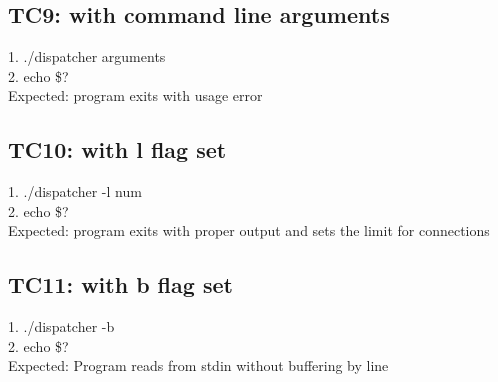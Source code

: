 \documentclass{article}
\begin{document}
\subsection*{TC9: with command line arguments}
1. ./dispatcher arguments\\
2. echo \$?\\
Expected: program exits with usage error\\
\subsection*{TC10: with l flag set}
1. ./dispatcher -l num\\
2. echo \$?\\
Expected: program exits with proper output and sets the limit for connections\\
\subsection*{TC11: with b flag set}
1. ./dispatcher -b\\
2. echo \$?\\
Expected: Program reads from stdin without buffering by line\\
\end{document}
